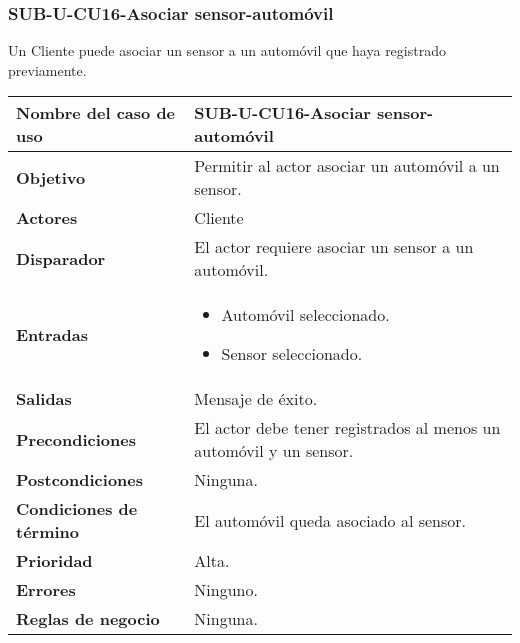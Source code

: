 \subsubsection{SUB-U-CU16-Asociar sensor-automóvil}\label{SUB-U-CU16}
Un Cliente puede asociar un sensor a un automóvil que haya registrado previamente.

\begin{longtable}{|J{5cm}|J{10.3cm}|}
	\hline
	\textbf{Nombre del caso de uso} &
		SUB-U-CU16-Asociar sensor-automóvil \\ \hline
	\textbf{Objetivo} &
		Permitir al actor asociar un automóvil a un sensor. \\ \hline
	\textbf{Actores} &
		Cliente \\ \hline 
	\textbf{Disparador} & 
		El actor requiere asociar un sensor a un automóvil. \\ \hline 
	\textbf{Entradas} & 
		\begin{itemize}
				\item Automóvil seleccionado.
				\item Sensor seleccionado.
		\end{itemize}\\ \hline 
	\textbf{Salidas} & Mensaje de éxito.
		\\ \hline
	\textbf{Precondiciones} &
		El actor debe tener registrados al menos un automóvil y un sensor.\\ \hline
	\textbf{Postcondiciones} & Ninguna.
		\\ \hline
	\textbf{Condiciones de término} & El automóvil queda asociado al sensor.
		\\ \hline 
	\textbf{Prioridad} & 
		Alta. \\ \hline
	\textbf{Errores} & Ninguno.
		\\ \hline
	\textbf{Reglas de negocio} & Ninguna.
		 \\ \hline
\end{longtable}

